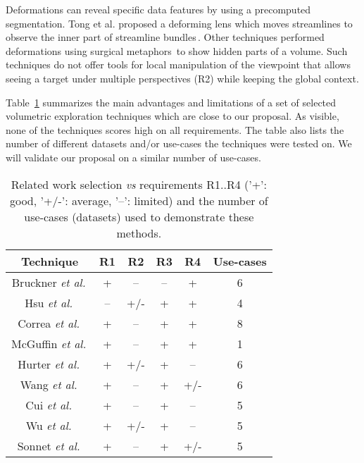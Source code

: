 Deformations can reveal specific data features by using a precomputed segmentation. Tong et al. proposed a deforming lens which moves streamlines to observe the inner part of streamline bundles\,\cite{7332955}. Other techniques performed deformations using surgical metaphors\,\cite{4069230,Correa:2006:FAV:1187627.1187827} to show hidden parts of a volume. Such techniques do not offer tools for local manipulation of the viewpoint that allows seeing a target under multiple perspectives (R2) while keeping the global context. 

Table~\ref{tab:methods} summarizes the main advantages and limitations of a set of selected volumetric exploration techniques which are close to our proposal. As visible, none of the techniques scores high on all requirements. The table also lists the number of different datasets and/or use-cases the techniques were tested on. We will validate our proposal on a similar number of use-cases. 
\begin{table}[htbp]
\centering
\small
\begin{tabular}{ |c|c|c|c|c|c| }
\hline
\textbf{Technique} & \textbf{R1} & \textbf{R2} & \textbf{R3} & \textbf{R4} & \textbf{Use-cases}\\
\hline
\hline
Bruckner \emph{et al.}\,\cite{4015467} & + & -- & -- & + & 6\\
Hsu \emph{et al.}\,\cite{Hsu:2011:RFM:2070781.2024165} & -- & +/- & + & + & 4\\
Correa \emph{et al.}\,\cite{Correa:2006:FAV:1187627.1187827} & + & -- & + & + & 8\\
McGuffin \emph{et al.}\,\cite{1250400} & + & -- & + & + & 1\\
Hurter \emph{et al.}\,\cite{6787171} & + & +/- & + & -- & 6\\
Wang \emph{et al.}\,\cite{1532818} & + & -- & + & +/- & 6\\
Cui \emph{et al.}\,\cite{cui10} & + & -- & + & -- & 5\\
Wu \emph{et al.}\,\cite{wu16} & + & +/- & + & -- & 5\\
Sonnet \emph{et al.}\,\cite{Sonnet:2004:IEA:989863.989871} & + & -- & + & +/- & 5\\
\hline
\end{tabular}
\caption{Related work selection \emph{vs} requirements R1..R4 ('+': good, '+/-': average, '--': limited) and the number of use-cases (datasets) used to demonstrate these methods.}
\label{tab:methods}
\end{table}



